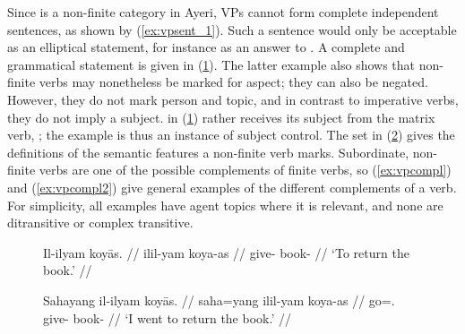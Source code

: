 Since  is a non-finite category in Ayeri, VPs cannot form complete
independent sentences, as shown by (\ref{ex:vpsent_1}). Such a sentence would
only be acceptable as an elliptical statement, for instance as an answer to
. A complete and
grammatical statement is given in (\ref{ex:vpsent_2}). The latter example also
shows that non-finite verbs may nonetheless be marked for aspect; they can also
be negated. However, they do not mark person and topic, and in contrast to
imperative verbs, they do not imply a subject.  in
(\ref{ex:vpsent_2}) rather receives its subject from the matrix verb,
; the example is thus an instance of subject
control. The set in (\ref{ex:verbmorphlex}) gives the definitions of the
semantic features a non-finite verb marks. Subordinate, non-finite verbs are
one of the possible complements of finite verbs, so (\ref{ex:vpcompl}) and
(\ref{ex:vpcompl2}) give general examples of the different complements of a
verb. For simplicity, all examples have agent topics where it is relevant, and
none are ditransitive or complex transitive.

\begin{figure}
\pex\label{ex:vpsent}
\a\label{ex:vpsent_1}\ljudge*\begingl
	\gla Il-ilyam koyās. //
	\glb il\til{}il-yam koya-as //
	\glc \Iter{}\til{}give-\Ptcp{} book-\Parg{} //
	\glft `To return the book.' //
\endgl

\a\label{ex:vpsent_2}\begingl
	\gla Sahayang il-ilyam koyās. //
	\glb saha=yang il\til{}il-yam koya-as //
	\glc go=\Fsg{}.\Aarg{} \Iter{}\til{}give-\Ptcp{} book-\Parg{} //
	\glft `I went to return the book.' //
\endgl
\xe
\end{figure}

\begin{figure}
\begin{morphlex}
\ex\label{ex:verbmorphlex}%
\xe
\end{morphlex}
\end{figure}

